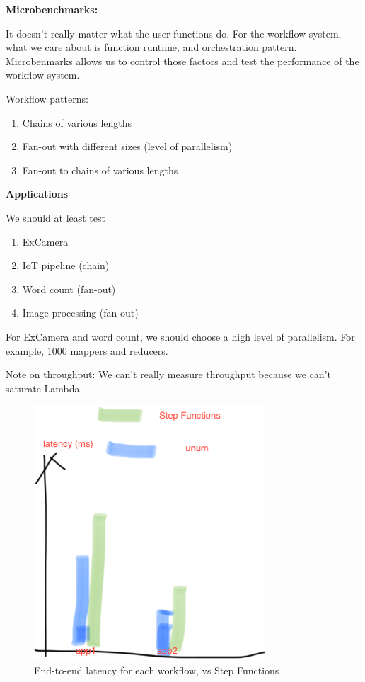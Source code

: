 \textbf{Microbenchmarks:}

It doesn't really matter what the user functions do. For the workflow system,
what we care about is function runtime, and orchestration pattern.
Microbenmarks allows us to control those factors and test the performance of
the workflow system.

Workflow patterns:

\begin{enumerate}
	\item Chains of various lengths
	\item Fan-out with different sizes (level of parallelism)
	\item Fan-out to chains of various lengths
\end{enumerate}

\textbf{Applications}

We should at least test

\begin{enumerate}
	\item ExCamera
	\item IoT pipeline (chain)
	\item Word count (fan-out)
	\item Image processing (fan-out)
\end{enumerate}

For ExCamera and word count, we should choose a high level of parallelism. For
example, 1000 mappers and reducers.

Note on throughput: We can't really measure throughput because we can't
saturate Lambda.

\begin{figure}[t!]
    \centering
    \includegraphics[width=\columnwidth]{figures/Sketch2.png}
    \caption{End-to-end latency for each workflow, \name{} vs Step Functions}
\end{figure}

